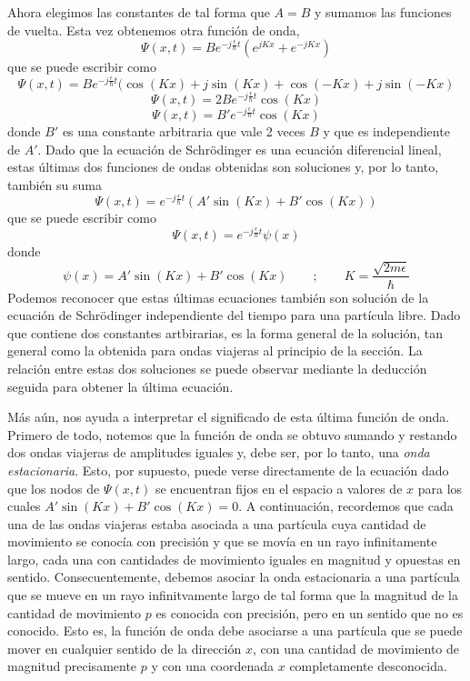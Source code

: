\documentclass[12pt,a4paper]{article}
\def\e{{\epsilon}} %
\begin{document}
Ahora elegimos las constantes de tal forma que $A=B$ y sumamos las funciones de vuelta. Esta vez obtenemos otra función de onda,
\[ \Psi (x,t)=Be^{-j\frac{\e}{\hbar}t}(e^{jKx}+e^{-jKx}) \]
que se puede escribir como
\[ \Psi (x,t)=Be^{-j\frac{\e}{\hbar}t}(\cos (Kx)+j\sin(Kx)+\cos(-Kx)+j\sin(-Kx) \]
\[ \Psi (x,t)=2Be^{-j\frac{\e}{\hbar}t}\cos(Kx) \]
\[ \Psi (x,t)=B'e^{-j\frac{\e}{\hbar}t}\cos(Kx) \]
donde $B'$ es una constante arbitraria que vale 2 veces $B$ y que es independiente de $A'$. Dado que la ecuación de Schrödinger es una ecuación diferencial lineal, estas últimas dos funciones de ondas obtenidas son soluciones y, por lo tanto, también su suma
\[ \Psi (x,t)=e^{-j\frac{\e}{\hbar}t}(A' \sin (Kx)+B'\cos(Kx)) \]
que se puede escribir como
\[ \Psi (x,t)=e^{-j\frac{\e}{\hbar}t}\psi (x) \]
donde
\[ \psi (x)=A' \sin(Kx)+B' \cos(Kx) \qquad ; \qquad K=\frac{\sqrt{2m\e}}{\hbar} \]
Podemos reconocer que estas últimas ecuaciones también son solución de la ecuación de Schrödinger independiente del tiempo para una partícula libre. Dado que contiene dos constantes artbirarias, es la forma general de la solución, tan general como la obtenida para ondas viajeras al principio de la sección. La relación entre estas dos soluciones se puede observar mediante la deducción seguida para obtener la última ecuación.

Más aún, nos ayuda a interpretar el significado de esta última función de onda. Primero de todo, notemos que la función de onda se obtuvo sumando y restando dos ondas viajeras de amplitudes iguales y, debe ser, por lo tanto, una \emph{onda estacionaria}. Esto, por supuesto, puede verse directamente de la ecuación dado que los nodos de $\Psi (x,t)$ se encuentran fijos en el espacio a valores de $x$ para los cuales $A' \sin (Kx)+B' \cos(Kx)=0$. A continuación, recordemos que cada una de las ondas viajeras estaba asociada a una partícula cuya cantidad de movimiento se conocía con precisión y que se movía en un rayo infinitamente largo, cada una con cantidades de movimiento iguales en magnitud y opuestas en sentido. Consecuentemente, debemos asociar la onda estacionaria a una partícula que se mueve en un rayo infinitvamente largo de tal forma que la magnitud de la cantidad de movimiento $p$ es conocida con precisión, pero en un sentido que no es conocido. Esto es, la función de onda debe asociarse a una partícula que se puede mover en cualquier sentido de la dirección $x$, con una cantidad de movimiento de magnitud precisamente $p$ y con una coordenada $x$ completamente desconocida.
\end{document}
